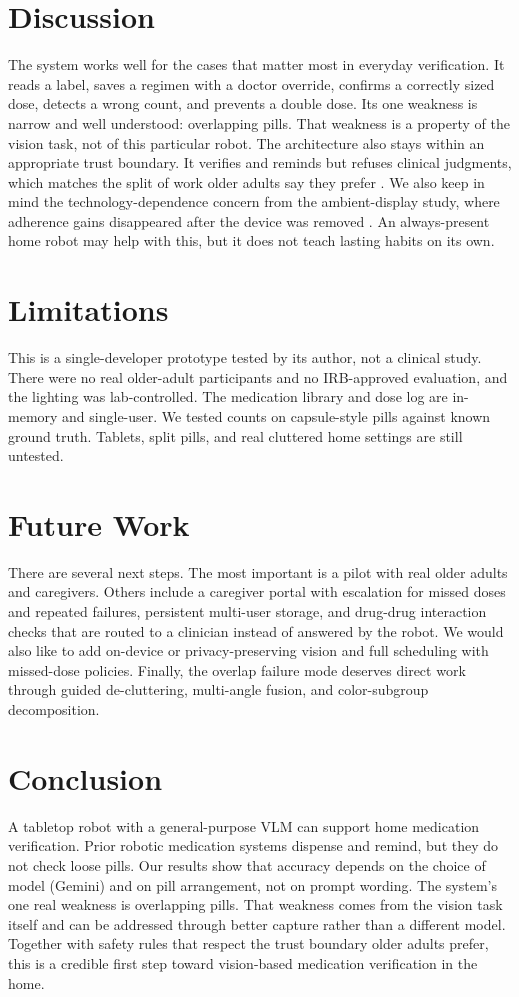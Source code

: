 \documentclass[10pt,twocolumn]{article}
\begin{document}
\section{Discussion}
The system works well for the cases that matter most in everyday verification. It
reads a label, saves a regimen with a doctor override, confirms a correctly sized
dose, detects a wrong count, and prevents a double dose. Its one weakness is narrow
and well understood: overlapping pills. That weakness is a property of the vision
task, not of this particular robot. The architecture also stays within an
appropriate trust boundary. It verifies and reminds but refuses clinical judgments,
which matches the split of work older adults say they prefer \cite{prakash2013}. We
also keep in mind the technology-dependence concern from the ambient-display study,
where adherence gains disappeared after the device was removed \cite{zarate2019}. An
always-present home robot may help with this, but it does not teach lasting habits on
its own.

\section{Limitations}
This is a single-developer prototype tested by its author, not a clinical study.
There were no real older-adult participants and no IRB-approved evaluation, and the
lighting was lab-controlled. The medication library and dose log are in-memory and
single-user. We tested counts on capsule-style pills against known ground truth.
Tablets, split pills, and real cluttered home settings are still untested.

\section{Future Work}
There are several next steps. The most important is a pilot with real older adults
and caregivers. Others include a caregiver portal with escalation for missed doses
and repeated failures, persistent multi-user storage, and drug-drug interaction
checks that are routed to a clinician instead of answered by the robot. We would also
like to add on-device or privacy-preserving vision and full scheduling with
missed-dose policies. Finally, the overlap failure mode deserves direct work through
guided de-cluttering, multi-angle fusion, and color-subgroup decomposition.

\section{Conclusion}
A tabletop robot with a general-purpose VLM can support home medication
verification. Prior robotic medication systems dispense and remind, but they do not
check loose pills. Our results show that accuracy depends on the choice of model
(Gemini) and on pill arrangement, not on prompt wording. The system's one real
weakness is overlapping pills. That weakness comes from the vision task itself and
can be addressed through better capture rather than a different model. Together with
safety rules that respect the trust boundary older adults prefer, this is a credible
first step toward vision-based medication verification in the home.
\end{document}

